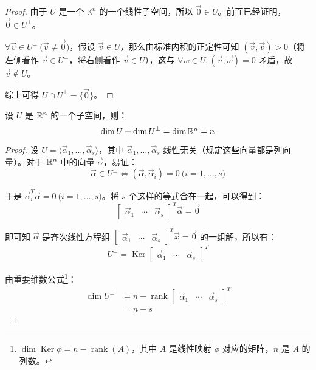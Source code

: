 \begin{proof}
	由于 $U$ 是一个 $\mathbb K^n$ 的一个线性子空间，所以 $\vec 0 \in U$。前面已经证明，$\vec 0 \in U^\perp$。

	$\forall \vec v \in U^\perp \pod{\vec v \ne \vec 0}$，假设 $\vec v \in U$，那么由标准内积的正定性可知 $(\vec v, \vec v) > 0$（将左侧看作 $\vec v \in U^\perp$，将右侧看作 $\vec v \in U$），这与 $\forall w \in U, (\vec v, \vec w) = 0$ 矛盾，故 $\vec v \not \in U$。

	综上可得 $U \cap U^\perp = \{\vec 0\}$。
\end{proof}

\begin{theorem}
	设 $U$ 是 $\mathbb R^n$ 的一个子空间，则：
	$$
	\dim U + \dim U^\perp = \dim \mathbb R^n = n
	$$
\end{theorem}

\begin{proof}
	设 $U = \langle \vec \alpha_1, \ldots, \vec \alpha_s \rangle$，其中 $\vec \alpha_1, \ldots, \vec \alpha_s$ 线性无关（规定这些向量都是列向量）。对于 $\mathbb R^n$ 中的向量 $\vec \alpha$，易证：
	$$
	\vec \alpha \in U^\perp \Longleftrightarrow (\vec \alpha, \vec \alpha_i) = 0 \pod{i = 1, \ldots, s}
	$$

	于是 $\vec \alpha_i^T \vec \alpha = 0 \pod{i = 1, \ldots, s}$。将 $s$ 个这样的等式合在一起，可以得到：
	$$
	\begin{bmatrix} \vec \alpha_1 & \cdots & \vec \alpha_s \end{bmatrix}^T \vec \alpha = \vec 0
	$$

	即可知 $\vec \alpha$ 是齐次线性方程组 $\begin{bmatrix} \vec \alpha_1 & \cdots & \vec \alpha_s \end{bmatrix}^T \vec x = \vec 0$ 的一组解，所以有：
	$$
	U^\perp = \operatorname{Ker} \begin{bmatrix} \vec \alpha_1 & \cdots & \vec \alpha_s \end{bmatrix}^T
	$$

	由重要维数公式\footnote{$\dim \operatorname{Ker} \phi = n - \operatorname{rank}(A)$，其中 $A$ 是线性映射 $\phi$ 对应的矩阵，$n$ 是 $A$ 的列数。}：
	$$
	\begin{aligned}
		\dim U^\perp &= n - \operatorname{rank} \begin{bmatrix} \vec \alpha_1 & \cdots & \vec \alpha_s \end{bmatrix}^T
		\\&=
		n - s
	\end{aligned}
	$$
\end{proof}


